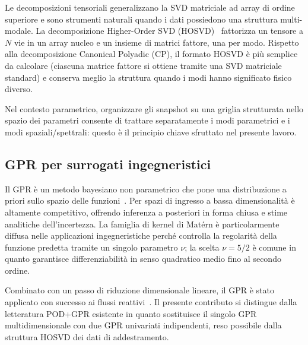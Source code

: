 Le decomposizioni tensoriali generalizzano la SVD matriciale ad array di ordine superiore e sono strumenti naturali quando i dati possiedono una struttura multi-modale. La decomposizione Higher-Order SVD (HOSVD)~\cite{de2000multilinear} fattorizza un tensore a $N$ vie in un array nucleo e un insieme di matrici fattore, una per modo. Rispetto alla decomposizione Canonical Polyadic (CP), il formato HOSVD è più semplice da calcolare (ciascuna matrice fattore si ottiene tramite una SVD matriciale standard) e conserva meglio la struttura quando i modi hanno significato fisico diverso.

Nel contesto parametrico, organizzare gli snapshot su una griglia strutturata nello spazio dei parametri consente di trattare separatamente i modi parametrici e i modi spaziali/spettrali: questo è il principio chiave sfruttato nel presente lavoro.

\subsection{GPR per surrogati ingegneristici}

Il GPR è un metodo bayesiano non parametrico che pone una distribuzione a priori sullo spazio delle funzioni~\cite{williams1995gaussian}. Per spazi di ingresso a bassa dimensionalità è altamente competitivo, offrendo inferenza a posteriori in forma chiusa e stime analitiche dell'incertezza. La famiglia di kernel di Matérn è particolarmente diffusa nelle applicazioni ingegneristiche perché controlla la regolarità della funzione predetta tramite un singolo parametro $\nu$; la scelta $\nu = 5/2$ è comune in quanto garantisce differenziabilità in senso quadratico medio fino al secondo ordine.

Combinato con un passo di riduzione dimensionale lineare, il GPR è stato applicato con successo ai flussi reattivi~\cite{aversano2021digital,procacci2025stochastic}. Il presente contributo si distingue dalla letteratura POD+GPR esistente in quanto sostituisce il singolo GPR multidimensionale con due GPR univariati indipendenti, reso possibile dalla struttura HOSVD dei dati di addestramento.
